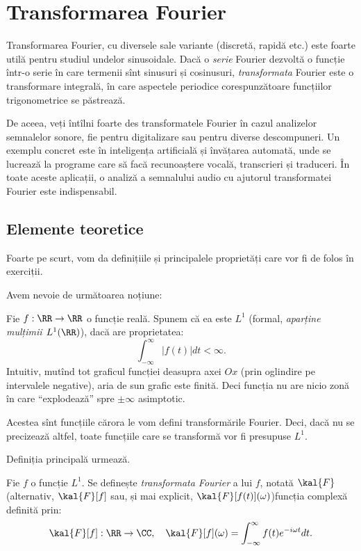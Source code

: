 
\chapter{Transformarea Fourier}

Transformarea Fourier, cu diversele sale variante (discretă, rapidă etc.)
este foarte utilă pentru studiul undelor sinusoidale. Dacă o \emph{serie}
Fourier dezvoltă o funcție într-o serie în care termenii sînt sinusuri
și cosinusuri, \emph{transformata} Fourier este o transformare integrală,
în care aspectele periodice corespunzătoare funcțiilor trigonometrice
se păstrează.

De aceea, veți întîlni foarte des transformatele Fourier în cazul analizelor
semnalelor sonore, fie pentru digitalizare sau pentru diverse descompuneri.
Un exemplu concret este în inteligența artificială și învățarea automată,
unde se lucrează la programe care să facă recunoaștere vocală, transcrieri
și traduceri. În toate aceste aplicații, o analiză a semnalului audio cu
ajutorul transformatei Fourier este indispensabil.

\section{Elemente teoretice}

Foarte pe scurt, vom da definițiile și principalele proprietăți care vor
fi de folos în exerciții.

Avem nevoie de următoarea noțiune:
\begin{definition}\label{def:functie-l1}
    Fie $ f : \RR \to \RR $ o funcție reală. Spunem că ea este $ L^1 $
    (formal, \emph{aparține mulțimii $ L^1(\RR) $}), dacă are proprietatea:
    \[
        \int_{-\infty}^\infty |f(t)| dt < \infty.
    \]
    Intuitiv, mutînd tot graficul funcției deasupra axei $ Ox $ (prin
    oglindire pe intervalele negative), aria de sun grafic este finită.
    Deci funcția nu are nicio zonă în care \enquote{explodează} spre
    $ \pm \infty $ asimptotic.
\end{definition}

Acestea sînt funcțiile cărora le vom defini transformările Fourier. Deci,
dacă nu se precizează altfel, toate funcțiile care se transformă vor fi
presupuse $ L^1 $.

Definiția principală urmează.

\begin{definition}\label{def:transf-f}
    Fie $ f $ o funcție $ L^1 $. Se definește \emph{transformata Fourier} a lui
    $ f $, notată $ \kal{F} $ (alternativ, $ \kal{F}[f] $ sau, și mai
    explicit, $ \kal{F}[f(t)](\omega) $)\footnotemark funcția complexă
    definită prin:
    \[
        \kal{F}[f] : \RR \to \CC, \quad \kal{F}[f](\omega) = %
        \int_{-\infty}^\infty f(t) e^{-i\omega t} dt.
    \]
\end{definition}

